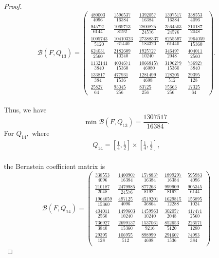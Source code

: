\documentclass[10pt,a4paper]{amsart}
\begin{document}
\begin{proof}
\[
\mathcal B(F,Q_{13})=
\begin{pmatrix}
	\frac{480003}{4096} & \frac{1596537}{16384} & \frac{1392057}{16384} & \frac{1307517}{16384} & \frac{338553}{4096}\\[5mm]
	\frac{945721}{6144} & \frac{1069713}{8192} & \frac{2800825}{24576} & \frac{2564503}{24576} & \frac{210187}{2048}\\[5mm]
	\frac{1005743}{5120} & \frac{10410323}{61440} & \frac{27388337}{184320} & \frac{8255597}{61440} & \frac{1964059}{15360}\\[5mm]
	\frac{624031}{2560} & \frac{2182609}{10240} & \frac{1925727}{10240} & \frac{346497}{2048} & \frac{404011}{2560}\\[5mm]
	\frac{1132141}{3840} & \frac{4004671}{15360} & \frac{10668157}{46080} & \frac{3196279}{15360} & \frac{736927}{3840}\\[5mm]
	\frac{133817}{384} & \frac{477931}{1536} & \frac{1281499}{4608} & \frac{128205}{512} & \frac{29395}{128}\\[5mm]
	\frac{25827}{64} & \frac{93045}{256} & \frac{83725}{256} & \frac{75663}{256} & \frac{17325}{64}
\end{pmatrix}.
\]\\
Thus, we have 
\[
\min \mathcal B(F,Q_{13})=\frac{1307517}{16384}.
\]
For $Q_{14},$ where
\begin{align*}
	Q_{14}=\left[\frac14,\frac12\right]\times\left[\frac14,\frac12\right],
\end{align*}\\
the Bernstein coefficient matrix is\\
\[
\mathcal B(F,Q_{14})=
\begin{pmatrix}
	\frac{338553}{4096} & \frac{1400907}{16384} & \frac{1578837}{16384} & \frac{1899297}{16384} & \frac{595983}{4096}\\[5mm]
	\frac{210187}{2048} & \frac{2479985}{24576} & \frac{877263}{8192} & \frac{999909}{8192} & \frac{905345}{6144}\\[5mm]
	\frac{1964059}{15360} & \frac{497125}{4096} & \frac{4519201}{36864} & \frac{1629815}{12288} & \frac{156895}{1024}\\[5mm]
	\frac{404011}{2560} & \frac{1499603}{10240} & \frac{1459963}{10240} & \frac{302057}{2048} & \frac{417471}{2560}\\[5mm]
	\frac{736927}{3840} & \frac{2699137}{15360} & \frac{1537061}{9216} & \frac{852653}{5120} & \frac{226571}{1280}\\[5mm]
	\frac{29395}{128} & \frac{106955}{512} & \frac{898999}{4608} & \frac{291607}{1536} & \frac{74993}{384}\\[5mm]

\end{pmatrix}\]
\end{proof}
\end{document}
